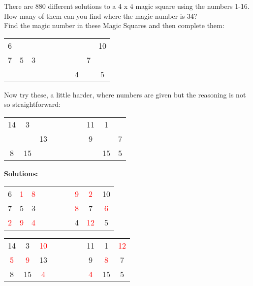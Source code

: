 \noindent There are 880 different solutions to a 4 x 4 magic square using the numbers 1-16. How many of them can you find where the magic number is 34?\\
	
\noindent Find the magic number in these Magic Squares and then complete them:
	\begin{center}
	\begin{tabular}{|c|c|c| cccc |c|c|c|} \cline{1-3} \cline{8-10}
	6 &  &    & & & & &   &  & 10\\ \cline{1-3} \cline{8-10}
	7 & 5 & 3   & & & & &   & 7 & \\ \cline{1-3} \cline{8-10}
	 &  &    & & & & &  4 & & 5 \\ \cline{1-3} \cline{8-10} 
	\end{tabular}
	\end{center}
	Now try these, a little harder, where numbers are given but the reasoning is not so straightforward:
	\begin{center}
	\begin{tabular}{|c|c|c| cccc |c|c|c|} \cline{1-3} \cline{8-10}
	14 & 3 &    & & & & &  11 & 1 & \\ \cline{1-3} \cline{8-10}
	 &  & 13   & & & & &  9 &  & 7\\ \cline{1-3} \cline{8-10}
	8 & 15 &    & & & & &   & 15 & 5 \\ \cline{1-3} \cline{8-10} 
	\end{tabular}
	\end{center}
	
	
	
	\textbf{Solutions:}
	\begin{center}
	\begin{tabular}{|c|c|c| cccc |c|c|c|} \cline{1-3} \cline{8-10}
	6 & \textcolor{red}{1} & \textcolor{red}{8}   & & & & & \textcolor{red}{9}  & \textcolor{red}{2} & 10\\ \cline{1-3} \cline{8-10}
	7 & 5 & 3   & & & & &  \textcolor{red}{8} & 7 &\textcolor{red}{6} \\ \cline{1-3} \cline{8-10}
	 \textcolor{red}{2}& \textcolor{red}{9} & \textcolor{red}{4}   & & & & &  4 & \textcolor{red}{12} & 5 \\ \cline{1-3} \cline{8-10} 
	\end{tabular}
	\end{center}
	
	\begin{center}
	\begin{tabular}{|c|c|c| cccc |c|c|c|} \cline{1-3} \cline{8-10}
	14 & 3 & \textcolor{red}{10}   & & & & &  11 & 1 & \textcolor{red}{12}\\ \cline{1-3} \cline{8-10}
	\textcolor{red}{5} & \textcolor{red}{9} & 13   & & & & &  9 & \textcolor{red}{8} & 7\\ \cline{1-3} \cline{8-10}
	8 & 15 & \textcolor{red}{4}   & & & & &  \textcolor{red}{4} & 15 & 5 \\ \cline{1-3} \cline{8-10} 
	\end{tabular}
	\end{center}
	
